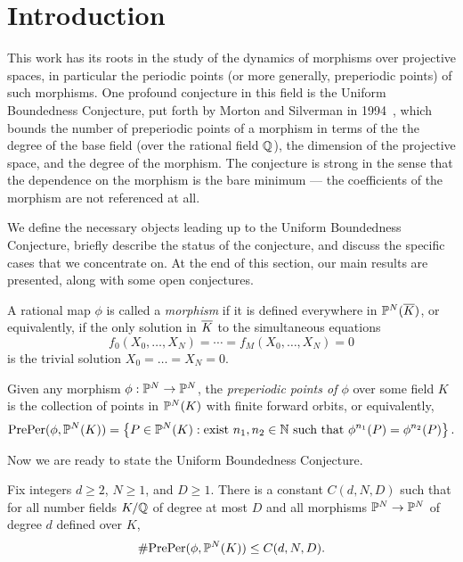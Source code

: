 \section{Introduction}
\label{sec:bg}

This work has its roots in the study of the dynamics of morphisms over
projective spaces, in particular the periodic points (or more
generally, preperiodic points) of such morphisms. One profound
conjecture in this field is the Uniform Boundedness Conjecture, put
forth by Morton and Silverman in 1994~\cite{MR1264933}, which bounds
the number of preperiodic points of a morphism in terms of the the
degree of the base field (over the rational field $\Q$), the dimension
of the projective space, and the degree of the morphism. The
conjecture is strong in the sense that the dependence on the morphism
is the bare minimum --- the coefficients of the morphism are not
referenced at all.

We define the necessary objects leading up to the Uniform Boundedness
Conjecture, briefly describe the status of the conjecture, and discuss
the specific cases that we concentrate on. At the end of this section,
our main results are presented, along with some open conjectures.


\begin{definition}
  A rational map $\phi$ is called a \emph{morphism} if it is defined
  everywhere in $\P^N(\ol{K})$, or equivalently, if the only solution
  in $\ol{K}$ to the simultaneous equations
  \[
  f_0(X_0, \dots, X_N) = \cdots = f_M(X_0, \dots, X_N) = 0
  \]
  is the trivial solution $X_0 = \dots = X_N = 0$.
\end{definition}

\begin{definition}
  Given any morphism $\phi: \P^N \to \P^N$, the \emph{preperiodic
    points of $\phi$} over some field $K$ is the collection of points
  in $\P^N(K)$ with finite forward orbits, or equivalently,
  \[
  \preper(\phi, \P^N(K)) = \set{P \in \P^N(K) : \text{exist $n_1, n_2
      \in \N$ such that $\phi^{n_1}(P) = \phi^{n_2}(P)$}}.
  \]
\end{definition}

Now we are ready to state the Uniform Boundedness Conjecture.

\begin{conjecture}
  Fix integers $d \ge 2$, $N \ge 1$, and $D \ge 1$. There is a
  constant $C(d, N, D)$ such that for all number fields $K/\Q$ of
  degree at most $D$ and all morphisms $\P^N \to \P^N$ of degree $d$
  defined over $K$,
  \[
  \#\preper(\phi, \P^N(K)) \le C(d, N, D).
  \]
\end{conjecture}

